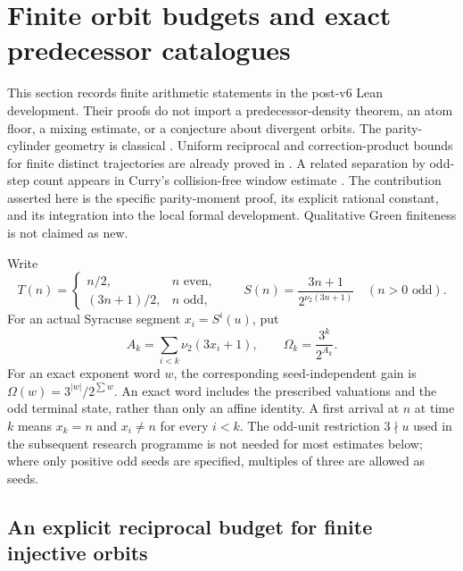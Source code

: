 \section{Finite orbit budgets and exact predecessor catalogues}
\label{sec:v7-finite-core}

This section records finite arithmetic statements in the post-v6 Lean
development. Their proofs do not import a predecessor-density theorem,
an atom floor, a mixing estimate, or a conjecture about divergent orbits.
The parity-cylinder geometry is classical
\cite{terras1976,lagarias2003}. Uniform reciprocal and correction-product
bounds for finite distinct trajectories are already proved in
\cite[Section~2]{valbuena2026}. A related separation by odd-step count
appears in Curry's collision-free window estimate
\cite[Theorem~2.3]{curry2026}. The contribution asserted here is the
specific parity-moment proof, its explicit rational constant, and its
integration into the local formal development. Qualitative Green
finiteness is not claimed as new.

Write
\[
 T(n)=\begin{cases}n/2,&n\text{ even},\\(3n+1)/2,&n\text{ odd},\end{cases}
 \qquad
 S(n)=\frac{3n+1}{2^{\nu_2(3n+1)}}\quad(n>0\text{ odd}).
\]
For an actual Syracuse segment $x_i=S^i(u)$, put
\[
 A_k=\sum_{i<k}\nu_2(3x_i+1),\qquad
 \Omega_k=\frac{3^k}{2^{A_k}}.
\]
For an exact exponent word $w$, the corresponding seed-independent gain
is $\Omega(w)=3^{|w|}/2^{\sum w}$. An exact word includes the prescribed
valuations and the odd terminal state, rather than only an affine identity.
A first arrival at $n$ at time $k$ means $x_k=n$ and $x_i\ne n$ for
every $i<k$. The odd-unit restriction $3\nmid u$ used in the subsequent
research programme is not needed for most estimates below; where only
positive odd seeds are specified, multiples of three are allowed as seeds.

\subsection{An explicit reciprocal budget for finite injective orbits}

